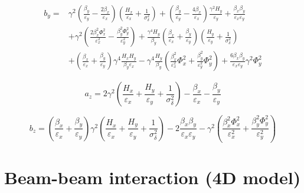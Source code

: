 \begin{equation}
    \begin{aligned}
    b_y = & \gamma^2 \left(\frac{\beta_y}{\varepsilon_y} - \frac{2 \beta_x}{\varepsilon_x}\right) \left(\frac{H_x}{\varepsilon_x} + \frac{1}{\sigma_{\delta}^{2}}\right) + \left(\frac{\beta_y}{\varepsilon_y} - \frac{4 \beta_x}{\varepsilon_x}\right) \frac{\gamma^2 H_y}{\varepsilon_y} + \frac{\beta_x \beta_y}{\varepsilon_x \varepsilon_y} \\
          & + \gamma^2 \left(\frac{2 \beta_x^{2} \Phi_x^{2}}{\varepsilon_x^{2}} - \frac{\beta_y^{2} \Phi_y^{2}}{\varepsilon_y^{2}}\right) + \frac{\gamma^4 H_y}{\beta_y} \left(\frac{\beta_x}{\varepsilon_x} + \frac{\beta_y}{\varepsilon_y}\right) \left(\frac{H_y}{\varepsilon_y} + \frac{1}{\sigma_{\delta}^{2}}\right)\\
          & + \left(\frac{\beta_x}{\varepsilon_x} + \frac{\beta_y}{\varepsilon_y}\right) \gamma^4 \frac{H_x H_y}{\beta_y \varepsilon_x} - \gamma^4 \frac{H_y}{\beta_y} \left(\frac{\beta_x^{2}}{\varepsilon_x^{2}} \Phi_x^{2} + \frac{\beta_y^{2}}{\varepsilon_y^{2}} \Phi_y^{2}\right) + \frac{6 \beta_x \beta_y}{\varepsilon_x \varepsilon_y} \gamma^2 \Phi_y^{2}
    \end{aligned}
    \label{equation:bm_by}
\end{equation}

\begin{equation}
    a_z = 2 \gamma^2 \left(\frac{H_x}{\varepsilon_x} + \frac{H_y}{\varepsilon_y} + \frac{1}{\sigma_{\delta}^{2}}\right) - \frac{\beta_x}{\varepsilon_x} - \frac{\beta_y}{\varepsilon_y}
    \label{equation:bm_az}
\end{equation}

\begin{equation}
    b_z = \left(\frac{\beta_x}{\varepsilon_x} + \frac{\beta_y}{\varepsilon_y}\right) \gamma^2 \left(\frac{H_x}{\varepsilon_x} + \frac{H_y}{\varepsilon_y} + \frac{1}{\sigma_{\delta}^{2}}\right) - 2 \frac{\beta_x \beta_y}{\varepsilon_x \varepsilon_y} - \gamma^2 \left(\frac{\beta_x^{2} \Phi_x^{2}}{\varepsilon_x^{2}} + \frac{\beta_y^{2} \Phi_y^{2}}{\varepsilon_y^{2}}\right)
    \label{equation:bm_bz}
\end{equation}

\section{Beam-beam interaction (4D model)}

